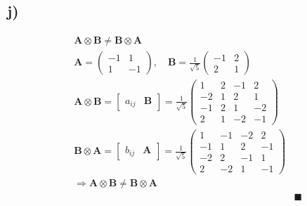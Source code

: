 \documentclass[fleqn]{article}
\begin{document}
\subsection*{j)}
\begin{align*}
	&\mathbf{A\otimes B\neq B\otimes A}& \\
	&\mathbf{A}=
	\begin{pmatrix}
	-1 & 1 \\
	1 & -1 
	\end{pmatrix},\quad\mathbf{B}=\frac{1}{\sqrt{5}}
	\begin{pmatrix}
	-1 & 2 \\
	2 & 1
	\end{pmatrix}& \\
	&\mathbf{A\otimes B}=
	\begin{bmatrix}
	a_{ij} & \mathbf{B}
	\end{bmatrix}=\frac{1}{\sqrt{5}}
	\begin{pmatrix}
	1 & 2 & -1 & 2 \\
	-2 & 1 & 2 & 1 \\
	-1 & 2 & 1 & -2 \\
	2 & 1 & -2 & -1
	\end{pmatrix}& \\
	&\mathbf{B\otimes A}=
	\begin{bmatrix}
	b_{ij} & \mathbf{A}
	\end{bmatrix}=\frac{1}{\sqrt{5}}
	\begin{pmatrix}
	1 & -1 & -2 & 2 \\
	-1 & 1 & 2 & -1 \\
	-2 & 2 & -1 & 1 \\
	2 & -2 & 1 & -1
	\end{pmatrix}& \\
	&\Rightarrow\mathbf{A\otimes B\neq B\otimes A}& \\
	& &\blacksquare
\end{align*}
\end{document}
